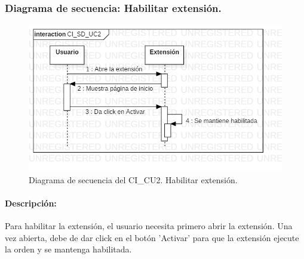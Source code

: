 \documentclass[12pt, a4paper, titlepage]{report}
\begin{document}
    		    
    		     \subsubsection{Diagrama de secuencia: Habilitar extensión.}
    			    \begin{figure}[H]
    				    \begin{center} \includegraphics[width=14cm]{./imagenes/Disenio/Componente_1/CI_SD_UC2.png}
    				    \caption[Diagrama de secuencia 2 del Componente I]{Diagrama de secuencia del CI\_CU2. Habilitar extensión.}
    			        \end{center}
    			    \end{figure}
    			    
    			    \paragraph{Descripción:}
    			    Para habilitar la extensión, el usuario necesita primero abrir la extensión. Una vez abierta, debe de dar click en el botón 'Activar' para que la extensión ejecute la orden y se mantenga habilitada.
    			    
    			
\end{document}

